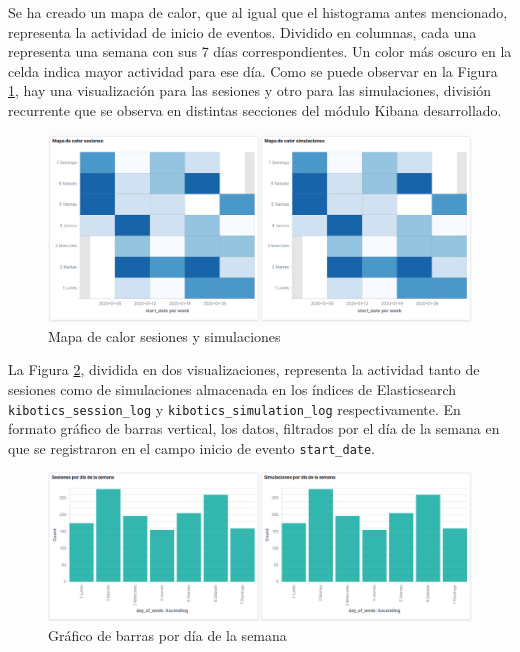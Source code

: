 \documentclass[a4paper, 12pt]{book}
\begin{document}
		Se ha creado un mapa de calor, que al igual que el histograma antes mencionado, representa la actividad de inicio de eventos. Dividido en columnas, cada una representa una semana con sus 7 días correspondientes. Un color más oscuro en la celda indica mayor actividad para ese día. Como se puede observar en la Figura \ref{fig:kibana_heatmap}, hay una visualización para las sesiones y otro para las simulaciones, división recurrente que se observa en distintas secciones del módulo Kibana desarrollado.
		\begin{figure}[H]
			\centering
			\includegraphics[width=13cm, keepaspectratio]{img/kibana_02_heatMap}
			\caption{Mapa de calor sesiones y simulaciones}
			\label{fig:kibana_heatmap}
		\end{figure}
		
		La Figura \ref{fig:kibana_dayofweek}, dividida en dos visualizaciones, representa la actividad tanto de sesiones como de simulaciones almacenada en los índices de Elasticsearch \texttt{kibotics\_session\_log} y \texttt{kibotics\_simulation\_log} respectivamente. En formato gráfico de barras vertical, los datos, filtrados por el día de la semana en que se registraron en el campo inicio de evento \texttt{start\_date}. \\
		
		\begin{figure}[H]
			\centering
			\includegraphics[width=14cm, keepaspectratio]{img/kibana_03_day_of_week}
			\caption{Gráfico de barras por día de la semana}
			\label{fig:kibana_dayofweek}
		\end{figure}
		
\end{document}
